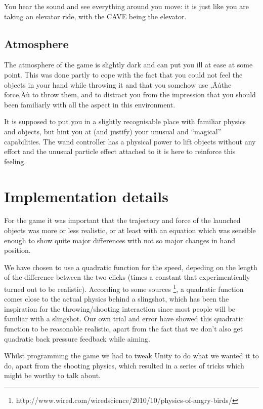 \documentclass[a4paper]{article}
\begin{document}
You hear the sound and see everything around you move: it is just like you are taking
an elevator ride, with the CAVE being the elevator.

\subsection{Atmosphere}
The atmosphere of the game is slightly dark and can put you ill at ease at some
point. This was done partly to cope with the fact that you could not feel the objects
in your hand while throwing it and that you somehow use ‚Äúthe force‚Äù to throw them,
and to distract you from the impression that you should been familiarly with all the
aspect in this environment.

It is supposed to put you in a slightly recognisable place with familiar physics and
objects, but hint you at (and justify) your unusual and ``magical'' capabilities. The wand
controller has a physical power to lift objects without any effort and the unusual particle effect attached to
it is here to reinforce this feeling.


\section{Implementation details}
\label{sec:inner}
For the game it was important that the trajectory and force of the launched objects was
more or less realistic, or at least with an equation which was sensible enough
to show quite major differences with not so major changes in hand position.

We have chosen to use a quadratic function for the speed, depeding on the length
of the difference between the two clicks (times a constant that experimentically
turned out to be realistic). According to some sources
\footnote{http://www.wired.com/wiredscience/2010/10/physics-of-angry-birds/},
a quadratic function comes close to the actual physics behind a slingshot, which
has been the inspiration for the throwing/shooting interaction since most people
will be familiar with a slingshot. Our own trial and error have showed this quadratic
function to be reasonable realistic, apart from the fact that we don't also get
quadratic back pressure feedback while aiming.

Whilst programming the game we had to tweak Unity to do what we wanted it to do,
apart from the shooting physics, which resulted in a series of tricks which might
be worthy to talk about.
\end{document}

